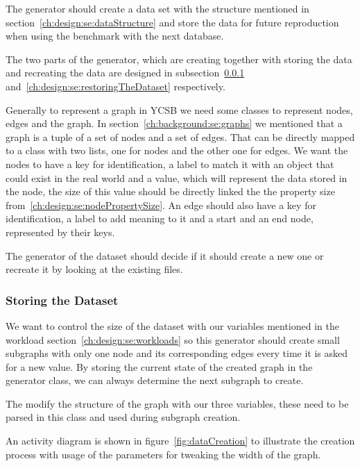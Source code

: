 The generator should create a data set with the structure mentioned in section~\ref{ch:design:se:dataStructure} and store the data for future reproduction when using the benchmark with the next database.

The two parts of the generator,
which are creating together with storing the data and recreating the data are designed in subsection~\ref{ch:design:se:storingTheDataset} and~\ref{ch:design:se:restoringTheDataset} respectively.

Generally to represent a graph in YCSB we need some classes to represent nodes, edges and the graph.
In section~\ref{ch:background:se:graphs} we mentioned that a graph is a tuple of a set of nodes and a set of edges.
That can be directly mapped to a class with two lists,
one for nodes and the other one for edges.
We want the nodes to have a key for identification,
a label to match it with an object that could exist in the real world and a value,
which will represent the data stored in the node,
the size of this value should be directly linked the the property size from~\ref{ch:design:se:nodePropertySize}.
An edge should also have a key for identification,
a label to add meaning to it and a start and an end node,
represented by their keys.

The generator of the dataset should decide if it should create a new one or recreate it by looking at the existing files.

\subsubsection{Storing the Dataset}
\label{ch:design:se:storingTheDataset}
We want to control the size of the dataset with our variables mentioned in the workload section~\ref{ch:design:se:workloads} so this generator should create small subgraphs with only one node and its corresponding edges every time it is asked for a new value.
By storing the current state of the created graph in the generator class,
we can always determine the next subgraph to create.

The modify the structure of the graph with our three variables,
these need to be parsed in this class and used during subgraph creation.

An activity diagram is shown in figure~\ref{fig:dataCreation} to illustrate the creation process with usage of the parameters for tweaking the width of the graph.

